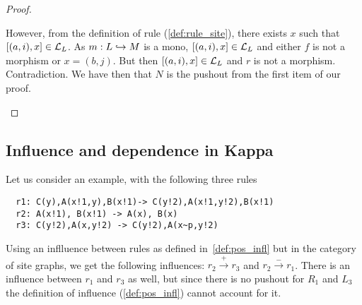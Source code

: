 \begin{proof}
\begin{enumerate}
However, from the definition of rule (\autoref{def:rule_site}), there exists $x$ such that $[(a,i),x]\in\mathcal{L}_L$. As $m:L\hookrightarrow M$ is a mono, $[(a,i),x]\in\mathcal{L}_L$ and either $f$ is not a morphism or $x=(b,j)$. But then $[(a,i),x]\in\mathcal{L}_L$ and $r$ is not a morphism. Contradiction.
%
    We have then that $N$ is the pushout from the first item of our proof.
  \end{enumerate}
\end{proof}

\subsection{Influence and dependence in Kappa}

\begin{example}
Let us consider an example, with the following three rules
\begin{verbatim}
  r1: C(y),A(x!1,y),B(x!1)-> C(y!2),A(x!1,y!2),B(x!1)
  r2: A(x!1), B(x!1) -> A(x), B(x)
  r3: C(y!2),A(x,y!2) -> C(y!2),A(x~p,y!2)
\end{verbatim}
Using an inflluence between rules as defined in~\autoref{def:pos_infl} but in the category of site graphs, we get the following influences: $r_2\xrightarrow{+} r_3$ and $r_2\xrightarrow{-} r_1$.
%
There is an influence between $r_1$ and $r_3$ as well, but since there is no pushout for $R_1$ and $L_3$ the definition of influence (\autoref{def:pos_infl}) cannot account for it.
\end{example}

